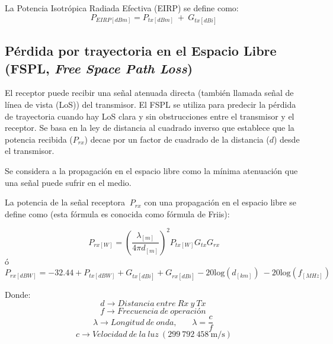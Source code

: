 La Potencia Isotrópica Radiada Efectiva (EIRP) se define como:
\begin{equation}
P_{EIRP[dBm]}=P_{tx\left[dBm\right]}{\ +\ G}_{tx[dBi]}
\label{eqn:EIRP}
\end{equation}

\subsection{Pérdida por trayectoria en el Espacio Libre (FSPL, \textit{Free Space Path Loss})}

El receptor puede recibir una señal atenuada directa (también llamada señal de línea de vista (LoS)) del transmisor. El FSPL se utiliza para predecir la pérdida de trayectoria cuando hay LoS clara y sin obstrucciones entre el transmisor y el receptor. Se basa en la ley de distancia al cuadrado inverso que establece que la potencia recibida ($P_{rx}$) decae por un factor de cuadrado de la distancia ($d$) desde el transmisor.\newline

Se considera a la propagación en el espacio libre como la mínima atenuación que una señal puede sufrir en el medio.\newline

La potencia de la señal receptora ${\ P}_{rx}$ con una propagación en el espacio libre se define como (esta fórmula es conocida como fórmula de Friis):\newline

\begin{equation}
P_{rx\left[W\right]}={\left(\frac{{\lambda }_{[m]}}{4\pi d_{[m]}}\right)}^2P_{tx\left[W\right]}G_{tx}G_{rx}  
\label{eqn:Friis}
\end{equation}
ó
\begin{equation}
P_{rx\left[dBW\right]}=-32.44+P_{tx\left[dBW\right]}+G_{tx\left[dBi\right]}+G_{rx\left[dBi\right]}-20{\mathrm{log} \left(d_{\left[km\right]}\right)\ }-20{\mathrm{log} \left(f_{\left[MHz\right]}\right)\ }
\label{eqn:Friss_dB}
\end{equation}

Donde:
\[d\to Distancia\ entre\ Rx\ y\ Tx\ \] 
\[f\to Frecuencia\ de\ operaci\textrm{ó}n\ \] 
\[\lambda \to Longitud\ de\ onda,\ \ \ \ \ \ \ \ \lambda =\frac{c}{f}\ \] 
\[c\to Velocidad\ de\ la\ luz\ (\mathrm{299\ 792\ 458\ m/s})\] 

